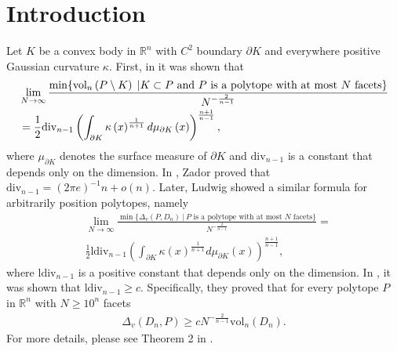 \documentclass[10pt, twoside, leqno]{article}
\theoremstyle{definition}
\numberwithin{equation}{section}
\newcommand{\R}{\mathbb{R}}
\newcommand{\NN}{N^{-\frac 2{n-1} }}
\begin{document}
\section{Introduction}

Let $ K$  be a convex body in $ \R^n $ with $ C^2 $ boundary $ \partial K$ and everywhere positive Gaussian curvature $\kappa$. First, in \cite{gruber1993asymptotic} it was shown that
\begin{align*}
&\lim_{N\to\infty}\frac{\min\{\text{vol}_n\left(P \setminus K\right)\;|\textrm{$ K \subset P  $ and $P$ is a polytope with at most $N$ facets}\}}{\NN} \\&= \frac{1}{2}\text{div}_{n-1}\left(\int_{\partial K} \kappa\left(x\right)^{\frac{1}{n+1}}d\mu_{\partial K}\left(x\right)\right)^{\frac{n+1}{n-1}},
\end{align*}
where  $ \mu_{\partial K} $ denotes the surface measure of $ \partial K  $ and $\text{div}_{n-1}$ is a constant that depends only on the dimension. In \cite{zador1982asymptotic}, Zador proved  that $ \text{div}_{n-1} = (2\pi e)^{-1}n + o(n).$  Later, Ludwig \citep{ludwig1999asymptotic} showed a similar formula for arbitrarily position polytopes, namely  
\begin{align*}
&\lim_{N\to\infty}\frac{\min\{\Delta_{v}(P,D_n)\;|\, P\textrm{ is a polytope with at most }N \textrm{ facets}\}}{\NN} =\\& \frac{1}{2}\textrm{ldiv}_{n-1}\left(\int_{\partial K} \kappa\left(x\right)^{\frac{1}{n+1}}d\mu_{\partial K}\left(x\right)\right)^{\frac{n+1}{n-1}},
\end{align*}
where  $ \textrm{ldiv}_{n-1} $ is a positive constant that depends only on the dimension. In \cite{Lud06}, it was shown that $ \textrm{ldiv}_{n-1} \geq c.$  Specifically, they proved that  for every polytope $ P $ in $ \R^n $ with $ N \geq 10^n $ facets  
\begin{align}
\Delta_v(D_n, P) \geq c\NN\text{vol}_n\left(D_n\right) .
\end{align} 
For more details, please see Theorem 2 in \cite{Lud06}. 
\end{document}
